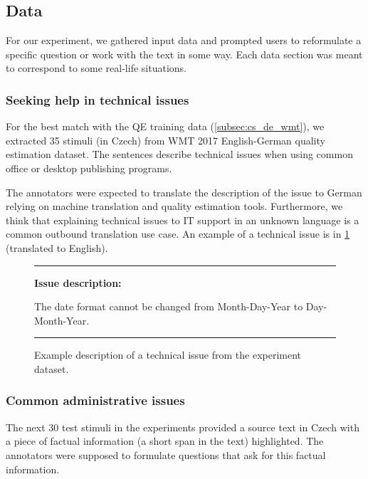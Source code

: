 \subsection{Data}

For our experiment, we gathered input data and prompted users to reformulate a specific question or work with the text in some way. Each data section was meant to correspond to some real-life situations.
\subsubsection{Seeking help in technical issues}

For the best match with the QE training data (\cref{subsec:cs_de_wmt}), we extracted 35 stimuli (in Czech) from WMT 2017 English-German quality estimation dataset. The sentences describe technical issues when using common office or desktop publishing programs.

The annotators were expected to translate the description of the issue to German relying on machine translation and quality estimation tools.
Furthermore, we think that explaining technical issues to IT support in an unknown language is a common outbound translation use case. An example of a technical issue is in \cref{fig:tech_example} (translated to English).

\begin{figure}[ht]
    \noindent\rule{\linewidth}{0.5pt}
    \textbf{Issue description:}
    
    The date format cannot be changed from Month-Day-Year to Day-Month-Year.
    
    \vspace{-0.2cm}\noindent\rule{\linewidth}{0.5pt}\vspace{-0.3cm}
    \caption{\label{fig:tech_example} Example description of a technical issue
    from the experiment dataset.}
\end{figure}

\subsubsection{Common administrative issues}

The next 30 test stimuli in the experiments provided a source text in Czech with a piece of factual information (a short span in the text) highlighted. The annotators were supposed to formulate questions that ask for this factual information.

